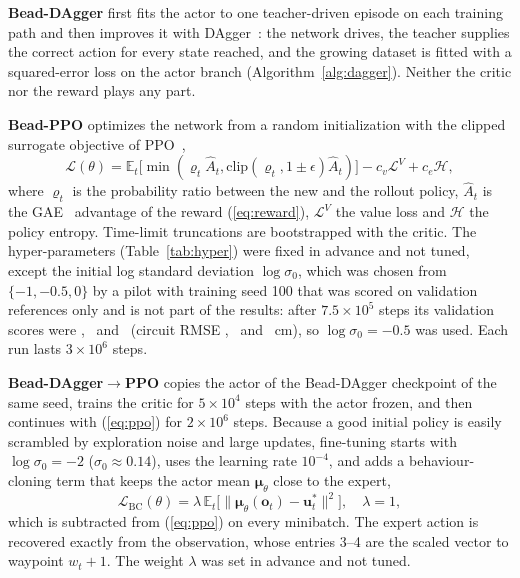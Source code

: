 \documentclass[conference]{IEEEtran}
\begin{document}
\textbf{Bead-DAgger} first fits the actor to one teacher-driven episode on each training path and then improves it with DAgger~\cite{ross2011}: the network drives, the teacher supplies the correct action for every state reached, and the growing dataset is fitted with a squared-error loss on the actor branch (Algorithm~\ref{alg:dagger}). Neither the critic nor the reward plays any part.

\textbf{Bead-PPO} optimizes the network from a random initialization with the clipped surrogate objective of PPO~\cite{schulman2017},
\begin{equation}
\mathcal{L}(\theta)=\mathbb{E}_t\big[\min(\varrho_t\hat A_t,\mathrm{clip}(\varrho_t,1\pm\epsilon)\hat A_t)\big]-c_v\mathcal{L}^{V}+c_e\mathcal{H},\label{eq:ppo}
\end{equation}
where $\varrho_t$ is the probability ratio between the new and the rollout policy, $\hat A_t$ is the GAE~\cite{schulman2016} advantage of the reward (\ref{eq:reward}), $\mathcal{L}^{V}$ the value loss and $\mathcal{H}$ the policy entropy. Time-limit truncations are bootstrapped with the critic. The hyper-parameters (Table~\ref{tab:hyper}) were fixed in advance and not tuned, except the initial log standard deviation $\log\sigma_0$, which was chosen from $\{-1,-0.5,0\}$ by a pilot with training seed 100 that was scored on validation references only and is not part of the results: after $7.5\times10^5$ steps its validation scores were \VpilotPmscore, \VpilotPhscore\ and \VpilotPzscore\ (circuit RMSE \VpilotPmrmse, \VpilotPhrmse\ and \VpilotPzrmse~cm), so $\log\sigma_0=-0.5$ was used. Each run lasts $3\times10^6$ steps.

\textbf{Bead-DAgger$\to$PPO} copies the actor of the Bead-DAgger checkpoint of the same seed, trains the critic for $5\times10^4$ steps with the actor frozen, and then continues with (\ref{eq:ppo}) for $2\times10^6$ steps. Because a good initial policy is easily scrambled by exploration noise and large updates, fine-tuning starts with $\log\sigma_0=-2$ ($\sigma_0\approx0.14$), uses the learning rate $10^{-4}$, and adds a behaviour-cloning term that keeps the actor mean $\boldsymbol{\mu}_\theta$ close to the expert,
\begin{equation}
\mathcal{L}_{\mathrm{BC}}(\theta)=\lambda\,\mathbb{E}_t\big[\|\boldsymbol{\mu}_\theta(\mathbf{o}_t)-\mathbf{u}^{*}_t\|^2\big],\quad\lambda=1,\label{eq:bc}
\end{equation}
which is subtracted from (\ref{eq:ppo}) on every minibatch. The expert action is recovered exactly from the observation, whose entries 3--4 are the scaled vector to waypoint $w_t+1$. The weight $\lambda$ was set in advance and not tuned.
\end{document}
